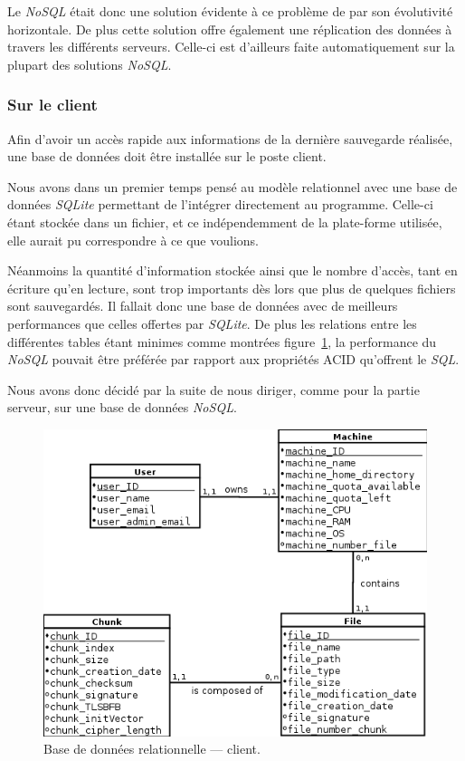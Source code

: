 \documentclass[a4paper,10pt, twoside]{report}
\begin{document}
\begin{spacing}{1.2}
Le \textit{NoSQL} était donc une solution évidente à ce problème de par
son évolutivité horizontale. De plus cette solution offre également une
réplication des données à travers les différents serveurs. Celle-ci
est d'ailleurs faite automatiquement sur la plupart des solutions
\textit{NoSQL}.

\subsubsection{Sur le client}

Afin d'avoir un accès rapide aux informations de la dernière sauvegarde
réalisée, une base de données doit être installée sur le poste client.

Nous avons dans un premier temps pensé au modèle relationnel avec une base
de données \textit{SQLite} permettant de l'intégrer directement au
programme. Celle-ci étant stockée dans un fichier, et ce indépendemment
de la plate-forme utilisée, elle aurait pu correspondre à ce que voulions.

Néanmoins la quantité d'information stockée ainsi que le nombre d'accès,
tant en écriture qu'en lecture, sont trop importants dès lors que plus de
quelques fichiers sont sauvegardés. Il fallait donc une base de données
avec de meilleurs performances que celles offertes par \textit{SQLite}. De
plus les relations entre les différentes tables étant minimes comme montrées
figure~\ref{dbRelClient}, la performance du \textit{NoSQL} pouvait être
préférée par rapport aux propriétés ACID qu'offrent le \textit{SQL}.

Nous avons donc décidé par la suite de nous diriger, comme pour la partie
serveur, sur une base de données \textit{NoSQL}.

\begin{figure}[h!]
  \centering
  \includegraphics[scale=0.69]{softwareDesign/dbRelClient.png}
  \caption{\label{dbRelClient} Base de données relationnelle --- client.}
\end{figure}


\end{spacing}
\end{document}
